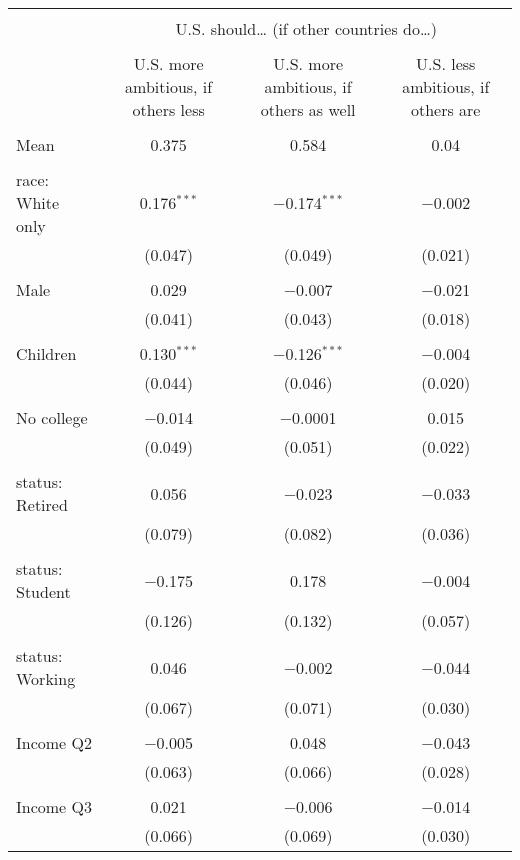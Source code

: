 
\begin{tabular}{@{\extracolsep{5pt}}lccc} 
\\[-1.8ex]\hline 
\hline \\[-1.8ex] 
 & \multicolumn{3}{c}{U.S. should… (if other countries do…)} \\ 
\cline{2-4} 
\\[-1.8ex] & U.S. more ambitious, if others less & U.S. more ambitious, if others as well & U.S. less ambitious, if others are \\ 
\hline \\[-1.8ex] 
 Mean & 0.375 & 0.584 & 0.04  \\ \hline \\[-1.8ex] race: White only & 0.176$^{***}$ & $-$0.174$^{***}$ & $-$0.002 \\ 
  & (0.047) & (0.049) & (0.021) \\ 
  & & & \\ 
 Male & 0.029 & $-$0.007 & $-$0.021 \\ 
  & (0.041) & (0.043) & (0.018) \\ 
  & & & \\ 
 Children & 0.130$^{***}$ & $-$0.126$^{***}$ & $-$0.004 \\ 
  & (0.044) & (0.046) & (0.020) \\ 
  & & & \\ 
 No college & $-$0.014 & $-$0.0001 & 0.015 \\ 
  & (0.049) & (0.051) & (0.022) \\ 
  & & & \\ 
 status: Retired & 0.056 & $-$0.023 & $-$0.033 \\ 
  & (0.079) & (0.082) & (0.036) \\ 
  & & & \\ 
 status: Student & $-$0.175 & 0.178 & $-$0.004 \\ 
  & (0.126) & (0.132) & (0.057) \\ 
  & & & \\ 
 status: Working & 0.046 & $-$0.002 & $-$0.044 \\ 
  & (0.067) & (0.071) & (0.030) \\ 
  & & & \\ 
 Income Q2 & $-$0.005 & 0.048 & $-$0.043 \\ 
  & (0.063) & (0.066) & (0.028) \\ 
  & & & \\ 
 Income Q3 & 0.021 & $-$0.006 & $-$0.014 \\ 
  & (0.066) & (0.069) & (0.030) \\ 

\end{tabular}
